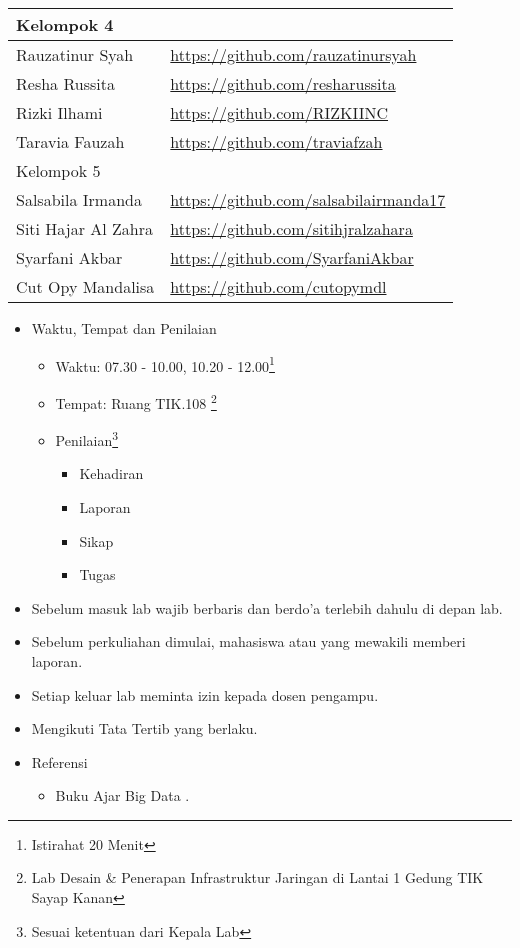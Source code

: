 \documentclass[a4paper]{tufte-handout}
\begin{document}
\begin{projects}
\begin{description}
\begin{table}[!ht]
\begin{tabular}{ll}
\midrule
Kelompok 4\\
\midrule
Rauzatinur Syah			& \url{https://github.com/rauzatinursyah} \\
Resha Russita			& \url{https://github.com/resharussita} \\
Rizki Ilhami			& \url{https://github.com/RIZKIINC} \\
Taravia Fauzah			& \url{https://github.com/traviafzah} \\
\midrule
Kelompok 5\\
\midrule
Salsabila Irmanda		& \url{https://github.com/salsabilairmanda17} \\
Siti Hajar Al Zahra		& \url{https://github.com/sitihjralzahara} \\
Syarfani Akbar			& \url{https://github.com/SyarfaniAkbar} \\
Cut Opy Mandalisa		& \url{https://github.com/cutopymdl} \\
\midrule
\end{tabular}
\end{table}
\end{description}
\end{projects}

\begin{maybe}
\begin{itemize}
\item Waktu, Tempat dan Penilaian

\begin{itemize}
\item Waktu: 07.30 - 10.00, 10.20 - 12.00\footnote{Istirahat 20 Menit}
\item Tempat: Ruang TIK.108 \footnote{Lab Desain \& Penerapan Infrastruktur Jaringan di Lantai 1 Gedung TIK Sayap Kanan}
\item Penilaian\footnote{Sesuai ketentuan dari Kepala Lab}
\begin{multicols}{2}
\begin{itemize}
\item Kehadiran
\item Laporan
\item Sikap
\item Tugas
\end{itemize}
\end{multicols}
\end{itemize}

\item Sebelum masuk lab wajib berbaris dan berdo'a terlebih dahulu di depan lab.
\item Sebelum perkuliahan dimulai, mahasiswa atau yang mewakili memberi laporan.
\item Setiap keluar lab meminta izin kepada dosen pengampu.
\item Mengikuti Tata Tertib yang berlaku.
\item Referensi
\begin{itemize}
\item Buku Ajar Big Data \citep{Mursyidah2020}.
\end{itemize}
\end{itemize}
\end{maybe}
\end{document}
